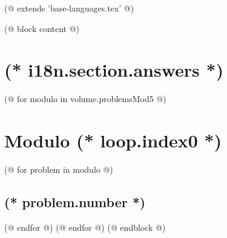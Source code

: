 (@ extends 'base-languages.tex' @)

(@ block content @)
    \pagestyle{main}
    \thispagestyle{first}
    \vspace*{19mm}
   
    \section{(* i18n.section.answers *)}
    \pagestyle{answers}
    (@ for modulo in volume.problemsMod5 @)
        \newpage%
        \section{Modulo (* loop.index0 *)}
        (@ for problem in modulo @)%
            \setcounter{volume}{(* volume.number *)}%
            \setcounter{problem}{(* problem.number *)}%
            \subsection{(* problem.number *)}%
        (@ endfor @)
    (@ endfor @)
(@ endblock @)    
